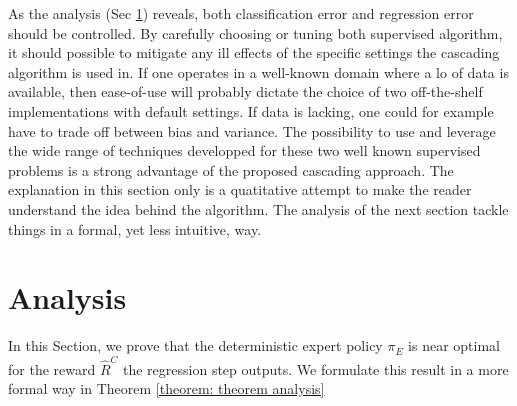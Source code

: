 \documentclass[smallextended]{svjour3}
\begin{document}
As the analysis (Sec \ref{sec:analysis}) reveals, both classification error and regression error should be controlled. By carefully choosing or tuning both supervised algorithm, it should possible to mitigate any ill effects of the specific settings the cascading algorithm is used in. If one operates in a well-known domain where a lo of data is available, then ease-of-use will probably dictate the choice of two off-the-shelf implementations with default settings. If data is lacking, one could for example have to trade off between bias and variance. The possibility to use and leverage the wide range of techniques developped for these two well known supervised problems is a strong advantage of the proposed cascading approach.
The explanation in this section only is a quatitative attempt to make the reader understand the idea behind the algorithm. The analysis of the next section tackle things in a formal, yet less intuitive, way.

\section{Analysis}
\label{sec:analysis}



In this Section, we prove that the deterministic expert policy $\pi_E$ is near optimal for the reward $\hat{R}^C$ the regression step outputs. We formulate this result in a more formal way in Theorem \ref{theorem: theorem analysis}
\end{document}
